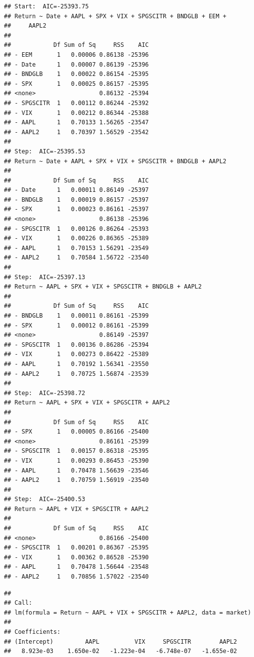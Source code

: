\documentclass[]{article}
\begin{document}
\begin{verbatim}
## Start:  AIC=-25393.75
## Return ~ Date + AAPL + SPX + VIX + SPGSCITR + BNDGLB + EEM + 
##     AAPL2
## 
##            Df Sum of Sq     RSS    AIC
## - EEM       1   0.00006 0.86138 -25396
## - Date      1   0.00007 0.86139 -25396
## - BNDGLB    1   0.00022 0.86154 -25395
## - SPX       1   0.00025 0.86157 -25395
## <none>                  0.86132 -25394
## - SPGSCITR  1   0.00112 0.86244 -25392
## - VIX       1   0.00212 0.86344 -25388
## - AAPL      1   0.70133 1.56265 -23547
## - AAPL2     1   0.70397 1.56529 -23542
## 
## Step:  AIC=-25395.53
## Return ~ Date + AAPL + SPX + VIX + SPGSCITR + BNDGLB + AAPL2
## 
##            Df Sum of Sq     RSS    AIC
## - Date      1   0.00011 0.86149 -25397
## - BNDGLB    1   0.00019 0.86157 -25397
## - SPX       1   0.00023 0.86161 -25397
## <none>                  0.86138 -25396
## - SPGSCITR  1   0.00126 0.86264 -25393
## - VIX       1   0.00226 0.86365 -25389
## - AAPL      1   0.70153 1.56291 -23549
## - AAPL2     1   0.70584 1.56722 -23540
## 
## Step:  AIC=-25397.13
## Return ~ AAPL + SPX + VIX + SPGSCITR + BNDGLB + AAPL2
## 
##            Df Sum of Sq     RSS    AIC
## - BNDGLB    1   0.00011 0.86161 -25399
## - SPX       1   0.00012 0.86161 -25399
## <none>                  0.86149 -25397
## - SPGSCITR  1   0.00136 0.86286 -25394
## - VIX       1   0.00273 0.86422 -25389
## - AAPL      1   0.70192 1.56341 -23550
## - AAPL2     1   0.70725 1.56874 -23539
## 
## Step:  AIC=-25398.72
## Return ~ AAPL + SPX + VIX + SPGSCITR + AAPL2
## 
##            Df Sum of Sq     RSS    AIC
## - SPX       1   0.00005 0.86166 -25400
## <none>                  0.86161 -25399
## - SPGSCITR  1   0.00157 0.86318 -25395
## - VIX       1   0.00293 0.86453 -25390
## - AAPL      1   0.70478 1.56639 -23546
## - AAPL2     1   0.70759 1.56919 -23540
## 
## Step:  AIC=-25400.53
## Return ~ AAPL + VIX + SPGSCITR + AAPL2
## 
##            Df Sum of Sq     RSS    AIC
## <none>                  0.86166 -25400
## - SPGSCITR  1   0.00201 0.86367 -25395
## - VIX       1   0.00362 0.86528 -25390
## - AAPL      1   0.70478 1.56644 -23548
## - AAPL2     1   0.70856 1.57022 -23540
\end{verbatim}

\begin{verbatim}
## 
## Call:
## lm(formula = Return ~ AAPL + VIX + SPGSCITR + AAPL2, data = market)
## 
## Coefficients:
## (Intercept)         AAPL          VIX     SPGSCITR        AAPL2  
##   8.923e-03    1.650e-02   -1.223e-04   -6.748e-07   -1.655e-02
\end{verbatim}
\end{document}
